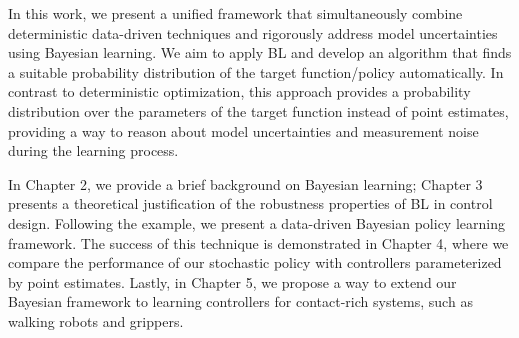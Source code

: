 In this work, we present a unified framework that simultaneously combine
deterministic data-driven techniques and rigorously address model uncertainties
using Bayesian learning.
%
We aim to apply BL and develop an algorithm that finds a suitable probability
distribution of the target function/policy automatically.
%
In contrast to deterministic optimization, this approach provides a probability
distribution over the parameters of the target function instead of point
estimates, providing a way to reason about model uncertainties and measurement
noise during the learning process.
%

In Chapter 2, we provide a brief background on Bayesian learning; Chapter 3
presents a theoretical justification of the robustness properties of BL in
control design. Following the example, we present a data-driven Bayesian policy
learning framework. The success of this technique is demonstrated in Chapter 4,
where we compare the performance of our stochastic policy with controllers
parameterized by point estimates. Lastly, in Chapter 5, we propose a way to
extend our Bayesian framework to learning controllers for contact-rich systems,
such as walking robots and grippers.

